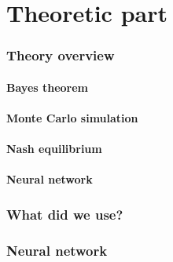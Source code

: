 \part{Theoretic part}

\section{Theory overview}
\subsection{Bayes theorem}
\subsection{Monte Carlo simulation}

\subsection{Nash equilibrium}

\subsection{Neural network}

\section{What did we use?}
\section{Neural network}